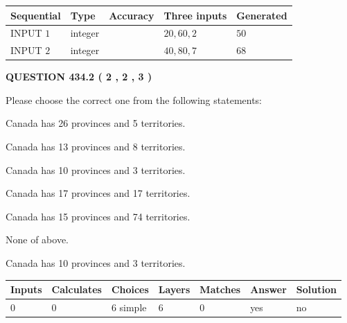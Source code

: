 \documentclass[12pt]{article}
\begin{document}
   
  
  
\noindent\begin{tabular}{|l|l|l|l|l|}
\hline
 Sequential & Type & Accuracy & Three inputs & Generated \\ 
\hline
 
 
  INPUT $  1 $ & integer &  & $
 20
 , 
 60
 , 
 2
 $ & $ 50 $ 
 \\  \hline  
 
 
  INPUT $  2 $ & integer &  & $
 40
 , 
 80
 , 
 7
 $ & $ 68 $ 
 \\  \hline  
 \end{tabular}
   
   
  
\vspace{0.2in}
  
{\textbf{\Large{QUESTION
434.2 
 ( 2 , 2 , 3 )
}}}
  
  
Please choose the correct one from the following statements:
 
 
Canada has  26 provinces and  5 territories.
 
 
Canada has  13 provinces and  8 territories.
 
 
Canada has 10  provinces and 3 territories.
 
 
Canada has  17 provinces and  17 territories.
 
 
Canada has  15 provinces and  74 territories.
 
 
 None of above.
 
 
\noindent{}
 
 
Canada has 10  provinces and 3 territories.
 
 
\noindent{}
 
 
   
   
   
   
\noindent\begin{tabular}{|l|l|l|l|l|l|l|}
 \hline
Inputs & Calculates & Choices & Layers & Matches & Answer & Solution \\ \hline
 0  & 
 0  & 
 6
  simple  
  & 
 6  & 
 0  & 
  yes & 
  no 
  \\ \hline
 \end{tabular}
   
\end{document}
